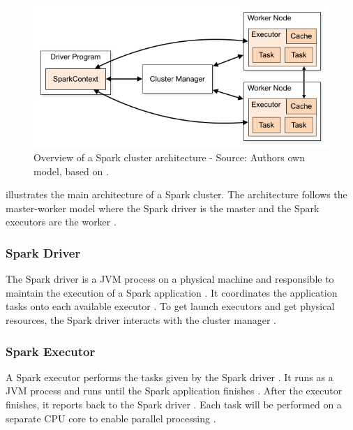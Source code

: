 \begin{figure}[h]
\centering
\includegraphics[scale=0.5]{images/04_technical_background/cluster_overview}
\caption{Overview of a Spark cluster architecture - Source: Authors own model, based on \cite{Apache2020Spark}.}
\label{fig:spark_cluster_overview}
\end{figure}

 illustrates the main architecture of a Spark cluster. The architecture follows the master-worker model where the Spark driver is the master and the Spark executors are the worker \cite{Hien2018Spark}.


\subsubsection{Spark Driver}
\label{subsubsec:04_spark_architecture_driver}
The Spark driver is a JVM process on a physical machine and responsible to maintain the execution of a Spark application \cite{Chambers2018Spark}. It coordinates the application tasks onto each available executor \cite{Hien2018Spark}. To get launch executors and get physical resources, the Spark driver interacts with the cluster manager \cite{Chambers2018Spark, Hien2018Spark}.


\subsubsection{Spark Executor}
A Spark executor performs the tasks given by the Spark driver \cite{Chambers2018Spark}. It runs as a JVM process and runs until the Spark application finishes \cite{Hien2018Spark}. After the executor finishes, it reports back to the Spark driver \cite{Chambers2018Spark}. Each task will be performed on a separate CPU core to enable parallel processing  \cite{Hien2018Spark}.


